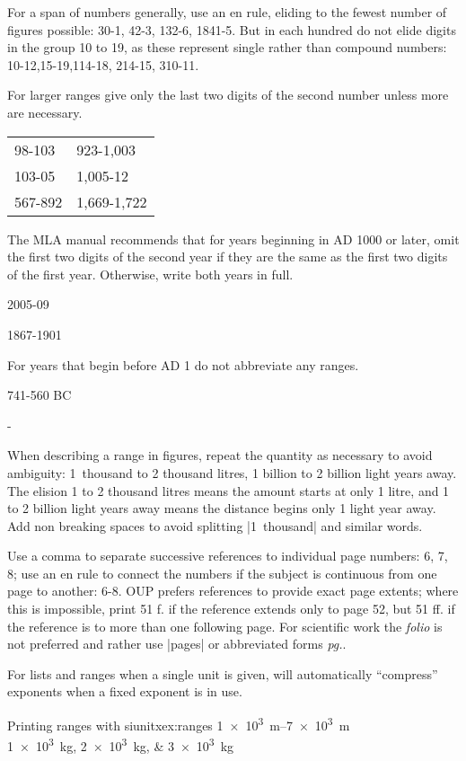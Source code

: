 For a span of numbers generally, use an en rule, eliding to the fewest
number of figures possible: 30-1, 42-3, 132-6, 1841-5. But in each hundred
do not elide digits in the group 10 to 19, as these represent single
rather than compound numbers: 10-12,15-19,114-18, 214-15, 310-11.

For larger ranges give only the last two digits of the second number unless more are necessary.

\begin{longtable}{ll}
98-103    &923-1,003\\
103-05    &1,005-12\\
567-892   &1,669-1,722\\
\end{longtable}

The MLA manual \citep{MLA} recommends that for years beginning in AD 1000 or later, omit the first two digits of the second year if they are the same as the first two digits of the first year. Otherwise, write both years in full.

2005-09

1867-1901

For years that begin before AD 1 do not abbreviate any ranges.

741-560 BC

-


When describing a range in figures, repeat the quantity as necessary to
avoid ambiguity: 1~thousand to 2 thousand litres, 1 billion to 2 billion light years
away. The elision 1 to 2 thousand litres means the amount starts at only
1 litre, and 1 to 2 billion light years away means the distance begins only
1 light year away. Add non breaking spaces to avoid splitting |1~thousand| and similar words.


Use a comma to separate successive references to individual page
numbers: 6, 7, 8; use an en rule to connect the numbers if the subject
is continuous from one page to another: 6-8. OUP prefers references to
provide exact page extents; where this is impossible, print 51 f. if the
reference extends only to page 52, but 51 ff. if the reference is to more than one following page. For scientific work the \textit{folio} is not preferred and rather use |pages| or abbreviated forms \textit{pg.}. 


 For lists and ranges when a single unit is given,  will
 automatically \enquote{compress} exponents when a fixed exponent is in use.

\begin{texexample}{Printing ranges with siunitx}{ex:ranges}
  \SIrange{1e3}{7e3}{\metre} \\
  \SIlist{1e3;2e3;3e3}{\kg}
\end{texexample}

